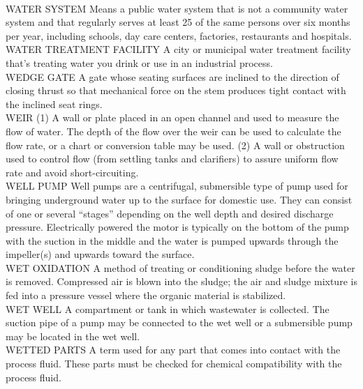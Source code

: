 \documentclass{article}
\begin{document}
\vspace{0.3cm}\\
WATER SYSTEM
Means a public water system that is not a community water system and that regularly serves at least 25 of the same persons over six months per year, including schools, day care centers, factories, restaurants and hospitals.
\vspace{0.3cm}\\
WATER TREATMENT FACILITY
A city or municipal water treatment facility that’s treating water you drink or use in an industrial process.
\vspace{0.3cm}\\
WEDGE GATE
A gate whose seating surfaces are inclined to the direction of closing thrust so that mechanical force on the stem produces tight contact with the inclined seat rings.
\vspace{0.3cm}\\
WEIR
(1) A wall or plate placed in an open channel and used to measure the flow of water. The depth of the flow over the weir can be used to calculate the flow rate, or a chart or conversion table may be used. (2) A wall or obstruction used to control flow (from settling tanks and clarifiers) to assure uniform flow rate and avoid short-circuiting.
\vspace{0.3cm}\\
WELL PUMP
Well pumps are a centrifugal, submersible type of pump used for bringing underground water up to the surface for domestic use. They can consist of one or several “stages” depending on the well depth and desired discharge pressure. Electrically powered the motor is typically on the bottom of the pump with the suction in the middle and the water is pumped upwards through the impeller(s) and upwards toward the surface.
\vspace{0.3cm}\\
WET OXIDATION
A method of treating or conditioning sludge before the water is removed. Compressed air is blown into the sludge; the air and sludge mixture is fed into a pressure vessel where the organic material is stabilized.
\vspace{0.3cm}\\
WET WELL
A compartment or tank in which wastewater is collected. The suction pipe of a pump may be connected to the wet well or a submersible pump may be located in the wet well.
\vspace{0.3cm}\\
WETTED PARTS
A term used for any part that comes into contact with the process fluid. These parts must be checked for chemical compatibility with the process fluid.
\end{document}

